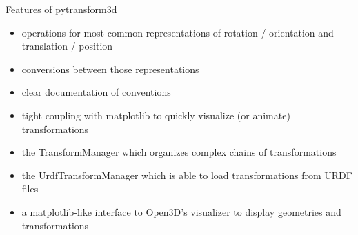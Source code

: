 \documentclass[14pt]{beamer}
\begin{document}
\begin{frame}{Features of pytransform3d}
\begin{itemize}
\item operations for most common representations of rotation / orientation and
  translation / position
\item conversions between those representations
\item clear documentation of conventions
\item tight coupling with matplotlib to quickly visualize (or animate)
  transformations
\item the TransformManager which organizes complex chains of transformations
\item the UrdfTransformManager which is able to load transformations from URDF
  files
\item a matplotlib-like interface to Open3D’s visualizer to display geometries and
  transformations
\end{itemize}
\end{frame}
\end{document}
